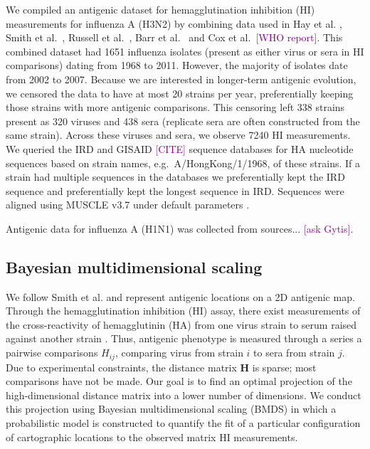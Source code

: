 \documentclass[11pt,oneside,letterpaper]{article}
\def\tbc#1{\textcolor{purple}{[#1]}}
\begin{document}
We compiled an antigenic dataset for hemagglutination inhibition (HI) measurements for influenza A (H3N2) by combining data used in Hay et al. \cite{Hay01}, Smith et al.\ \cite{Smith04}, Russell et al.\ \cite{Russell08}, Barr et al.\ \cite{Barr10} and Cox et al.\ \tbc{WHO report}. 
This combined dataset had 1651 influenza isolates (present as either virus or sera in HI comparisons) dating from 1968 to 2011. 
However, the majority of isolates date from 2002 to 2007. 
Because we are interested in longer-term antigenic evolution, we censored the data to have at most 20 strains per year, preferentially keeping those strains with more antigenic comparisons. 
This censoring left 338 strains present as 320 viruses and 438 sera (replicate sera are often constructed from the same strain). 
Across these viruses and sera, we observe 7240 HI measurements. 
We queried the IRD \cite{IRD} and GISAID \tbc{CITE} sequence databases for HA nucleotide sequences based on strain names, e.g.\ A/HongKong/1/1968, of these strains. 
If a strain had multiple sequences in the databases we preferentially kept the IRD sequence and preferentially kept the longest sequence in IRD. 
Sequences were aligned using MUSCLE v3.7 under default parameters \cite{MUSCLE}.

Antigenic data for influenza A (H1N1) was collected from sources... \tbc{ask Gytis}.

\subsection*{Bayesian multidimensional scaling}

We follow Smith et al. \cite{Smith04} and represent antigenic locations on a 2D antigenic map. 
Through the hemagglutination inhibition (HI) assay, there exist measurements of the cross-reactivity of hemagglutinin (HA) from one virus strain to serum raised against another strain \cite{Hirst43}. 
Thus, antigenic phenotype is measured through a series a pairwise comparisons $H_{ij}$, comparing virus from strain $i$ to sera from strain $j$. 
Due to experimental constraints, the distance matrix $\mathbf{H}$ is sparse; most comparisons have not be made. 
Our goal is to find an optimal projection of the high-dimensional distance matrix into a lower number of dimensions. 
We conduct this projection using Bayesian multidimensional scaling (BMDS) \cite{Oh01} in which a probabilistic model is constructed to quantify the fit of a particular configuration of cartographic locations to the observed matrix HI measurements.
\end{document}
